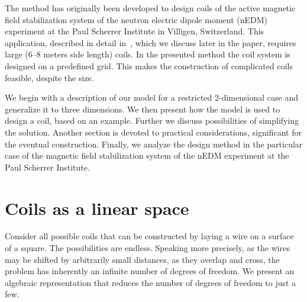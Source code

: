 The method has originally been developed to design coils of the active magnetic field stabilization system of the neutron electric dipole moment (nEDM) experiment at the Paul Scherrer Institute in Villigen, Switzerland. This application, described in detail in~\cite{Afach2014}, which we discuss later in the paper, requires large (6--8 meters side length) coils. In the presented method the coil system is designed on a predefined grid. This makes the construction of complicated coils feasible, despite the size.

We begin with a description of our model for a restricted 2-dimensional case and generalize it to three dimensions. We then present how the model is used to design a coil, based on an example. Further we discuss possibilities of simplifying the solution. Another section is devoted to practical considerations, significant for the eventual construction. Finally, we analyze the design method in the particular case of the magnetic field stabilization system of the nEDM experiment at the Paul Scherrer Institute.



\section{Coils as a linear space}
Consider all possible coils that can be constructed by laying a wire on a surface of a square. The possibilities are endless. Speaking more precisely, as the wires may be shifted by arbitrarily small distances, as they overlap and cross, the problem has inherently an infinite number of degrees of freedom. We present an algebraic representation that reduces the number of degrees of freedom to just a few.

